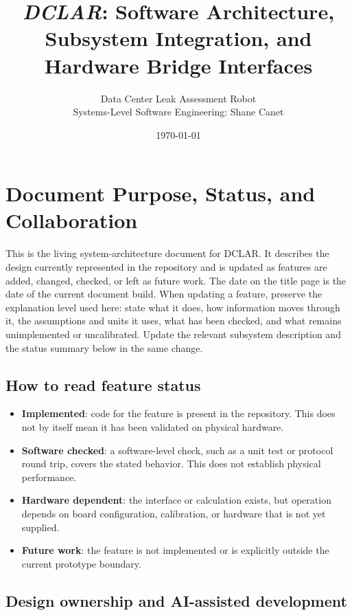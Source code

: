 \documentclass{article}
\title{\textbf{\textit{DCLAR}: Software Architecture, Subsystem Integration, and Hardware Bridge Interfaces}}
\author{Data Center Leak Assessment Robot \\ Systems-Level Software Engineering: Shane Canet}
\date{\today}
\begin{document}
\maketitle
\tableofcontents
\newpage

\section{Document Purpose, Status, and Collaboration}

This is the living system-architecture document for DCLAR. It describes the design currently represented in the repository and is updated as features are added, changed, checked, or left as future work. The date on the title page is the date of the current document build. When updating a feature, preserve the explanation level used here: state what it does, how information moves through it, the assumptions and units it uses, what has been checked, and what remains unimplemented or uncalibrated. Update the relevant subsystem description and the status summary below in the same change.

\subsection{How to read feature status}

\begin{itemize}
    \item \textbf{Implemented}: code for the feature is present in the repository. This does not by itself mean it has been validated on physical hardware.
    \item \textbf{Software checked}: a software-level check, such as a unit test or protocol round trip, covers the stated behavior. This does not establish physical performance.
    \item \textbf{Hardware dependent}: the interface or calculation exists, but operation depends on board configuration, calibration, or hardware that is not yet supplied.
    \item \textbf{Future work}: the feature is not implemented or is explicitly outside the current prototype boundary.
\end{itemize}

\subsection{Design ownership and AI-assisted development}
\end{document}
